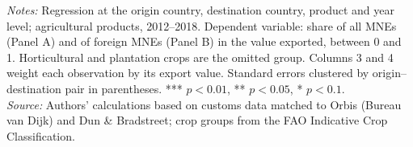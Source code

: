 \begin{table}[htbp]
\centering
\caption{Multinational share of agricultural exports, by type of production: regressions}
\label{tab:ap_crop_share}
{\footnotesize\setlength{\tabcolsep}{4pt}\setlength{\extrarowheight}{1pt}
}

\begin{minipage}{0.95\linewidth}
\notesize
\vspace{0.6em}
\textit{Notes:} Regression at the origin country, destination country, product and year level; agricultural products, 2012--2018. Dependent variable: share of all MNEs (Panel A) and of foreign MNEs (Panel B) in the value exported, between 0 and 1. Horticultural and plantation crops are the omitted group. Columns 3 and 4 weight each observation by its export value. Standard errors clustered by origin--destination pair in parentheses. *** $p<0.01$, ** $p<0.05$, * $p<0.1$.\\
\textit{Source:} Authors' calculations based on customs data matched to Orbis (Bureau van Dijk) and Dun \& Bradstreet; crop groups from the FAO Indicative Crop Classification.
\end{minipage}
\end{table}

\FloatBarrier
